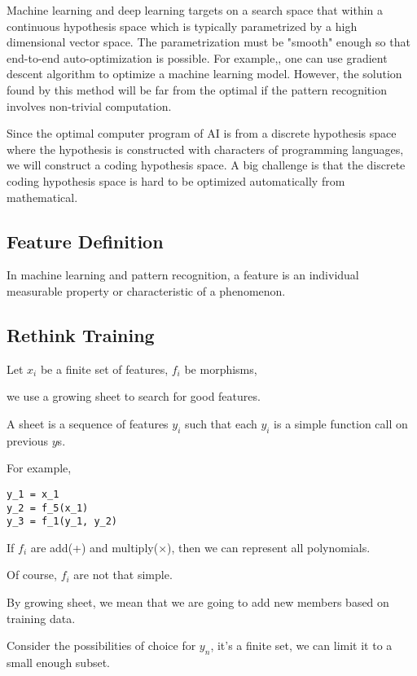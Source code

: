 \documentclass[11pt]{article} 	%
\theoremstyle{definition}
\begin{document}
Machine learning and deep learning targets on a search space that within a continuous hypothesis space which is typically parametrized by a high dimensional vector space.  The parametrization must be "smooth" enough so that end-to-end auto-optimization is possible.  For example,, one can use gradient descent algorithm to optimize a machine learning model. However, the solution found by this method will be far from the optimal if the pattern recognition involves non-trivial computation.  

Since the optimal computer program of AI is from a discrete hypothesis space where the hypothesis is constructed with characters of programming languages, we will construct a coding hypothesis space. A big challenge is that the  discrete coding hypothesis space is hard to be optimized automatically from mathematical. 
\subsection{Feature Definition}
In machine learning and pattern recognition, a feature is an individual measurable property or characteristic of a phenomenon\cite{bishop2006pattern}.

\subsection{Rethink Training}

Let $x_i$ be a finite set of features, $f_i$ be morphisms,

we use a growing sheet to search for good features.

A sheet is a sequence of features $y_i$ such that each $y_i$ is a simple function call on previous $y$s.

For example,

\begin{verbatim}
y_1 = x_1
y_2 = f_5(x_1)
y_3 = f_1(y_1, y_2)
\end{verbatim}


If $f_i$ are add(+) and multiply($\times$), then we can represent all polynomials.

Of course, $f_i$ are not that simple.

By growing sheet, we mean that we are going to add new members based on training data.

Consider the possibilities of choice for $y_n$, it's a finite set, we can limit it to a small enough subset.
\end{document}
